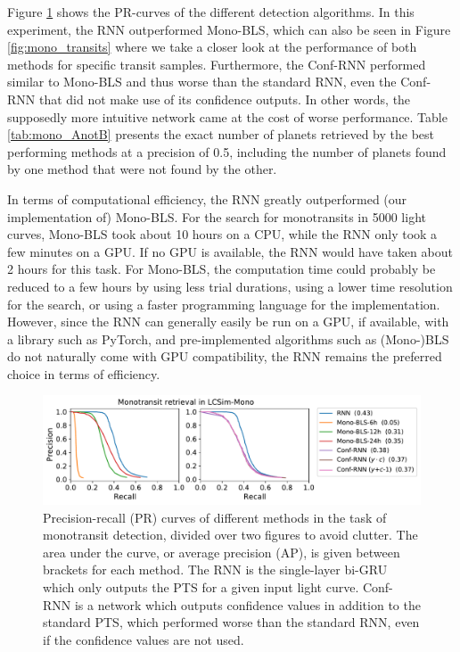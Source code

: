 Figure \ref{fig:mono_pr} shows the PR-curves of the different detection algorithms. In this experiment, the RNN outperformed Mono-BLS, which can also be seen in Figure \ref{fig:mono_transits} where we take a closer look at the performance of both methods for specific transit samples. Furthermore, the Conf-RNN performed similar to Mono-BLS and thus worse than the standard RNN, even the Conf-RNN that did not make use of its confidence outputs. In other words, the supposedly more intuitive network came at the cost of worse performance. Table \ref{tab:mono_AnotB} presents the exact number of planets retrieved by the best performing methods at a precision of 0.5, including the number of planets found by one method that were not found by the other.

In terms of computational efficiency, the RNN greatly outperformed (our implementation of) Mono-BLS. For the search for monotransits in 5000 light curves, Mono-BLS took about 10 hours on a CPU, while the RNN only took a few minutes on a GPU. If no GPU is available, the RNN would have taken about 2 hours for this task. For Mono-BLS, the computation time could probably be reduced to a few hours by using less trial durations, using a lower time resolution for the search, or using a faster programming language for the implementation. However, since the RNN can generally easily be run on a GPU, if available, with a library such as PyTorch, and pre-implemented algorithms such as (Mono-)BLS do not naturally come with GPU compatibility, the RNN remains the preferred choice in terms of efficiency.

\begin{figure}
    \centering
    \includegraphics[width=0.8\linewidth]{Experiments/Figures/Monos/mono_pr.pdf}
    \caption{Precision-recall (PR) curves of different methods in the task of monotransit detection, divided over two figures to avoid clutter. The area under the curve, or average precision (AP), is given between brackets for each method. The RNN is the single-layer bi-GRU which only outputs the PTS for a given input light curve. Conf-RNN is a network which outputs confidence values in addition to the standard PTS, which performed worse than the standard RNN, even if the confidence values are not used.}
    \label{fig:mono_pr}
\end{figure}

